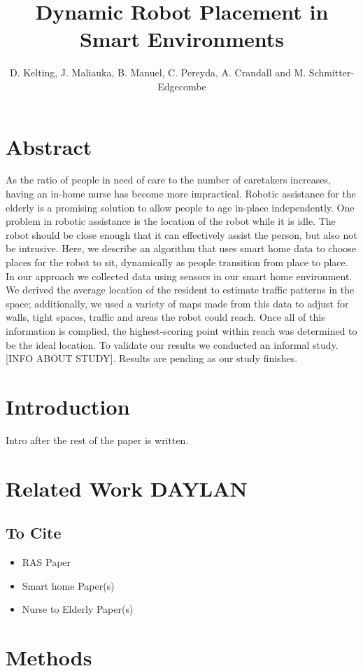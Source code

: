 \documentclass[11pt, draft, a4paper]{IEEEtran}
\author{D. Kelting, J. Maliauka, B. Manuel, C. Pereyda, A. Crandall and M. Schmitter-Edgecombe}
\title{Dynamic Robot Placement in Smart Environments}
\begin{document}
\maketitle


\section{Abstract}
As the ratio of people in need of care to the number of caretakers increases, having an in-home nurse has become more impractical. Robotic assistance for the elderly is a promising solution to allow people to age in-place independently. One problem in robotic assistance is the location of the robot while it is idle. The robot should be close enough that it can effectively assist the person, but also not be intrusive. Here, we describe an algorithm that uses smart home data to choose places for the robot to sit, dynamically as people transition from place to place. In our approach we collected data using sensors in our smart home environment. We derived the average location of the resident to estimate traffic patterns in the space; additionally, we used a variety of maps made from this data to adjust for walls, tight spaces, traffic and areas the robot could reach. Once all of this information is complied, the highest-scoring point within reach was determined to be the ideal location. To validate our results we conducted an informal study. [INFO ABOUT STUDY]. Results are pending as our study finishes.


\section{Introduction}
Intro after the rest of the paper is written. 


\section{Related Work DAYLAN}
\subsection{To Cite}
\begin{itemize}
    \item RAS Paper
    \item Smart home Paper(s)
    \item Nurse to Elderly Paper(s)
\end{itemize}


\section{Methods}
\end{document}
